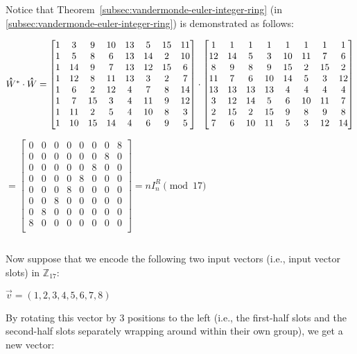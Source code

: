 $ $

$ $

Notice that Theorem~\ref*{subsec:vandermonde-euler-integer-ring} (in \autoref{subsec:vandermonde-euler-integer-ring}) is demonstrated as follows:

$\hathat{W}^* \cdot \hathat{W} = \begin{bmatrix}
1&3&9&10&13&5&15&11\\
1&5&8&6&13&14&2&10\\
1&14&9&7&13&12&15&6\\
1&12&8&11&13&3&2&7\\
1&6&2&12&4&7&8&14\\
1&7&15&3&4&11&9&12\\
1&11&2&5&4&10&8&3\\
1&10&15&14&4&6&9&5\\
\end{bmatrix} \cdot \begin{bmatrix}
1 & 1 & 1 & 1 & 1 & 1 & 1 & 1\\
12&14&5&3&10&11&7&6\\
8&9&8&9&15&2&15&2\\
11&7&6&10&14&5&3&12\\
13&13&13&13&4&4&4&4\\
3&12&14&5&6&10&11&7\\
2&15&2&15&9&8&9&8\\
7&6&10&11&5&3&12&14\\
\end{bmatrix}$

$ = \begin{bmatrix}
0 & 0 & 0 & 0 & 0 & 0 & 0 & 8\\
0 & 0 & 0 & 0 & 0 & 0 & 8 & 0\\
0 & 0 & 0 & 0 & 0 & 8 & 0 & 0\\
0 & 0 & 0 & 0 & 8 & 0 & 0 & 0\\
0 & 0 & 0 & 8 & 0 & 0 & 0 & 0\\
0 & 0 & 8 & 0 & 0 & 0 & 0 & 0\\
0 & 8 & 0 & 0 & 0 & 0 & 0 & 0\\
8 & 0 & 0 & 0 & 0 & 0 & 0 & 0\\
\end{bmatrix} = n I_n^{R} \pmod{17}$

$ $

Now suppose that we encode the following two input vectors (i.e., input vector slots) in $\mathbb{Z}_{17}$:

$\vec{v} = (1, 2, 3, 4, 5, 6, 7, 8)$

By rotating this vector by 3 positions to the left (i.e., the first-half slots and the second-half slots separately wrapping around within their own group), we get a new vector:

